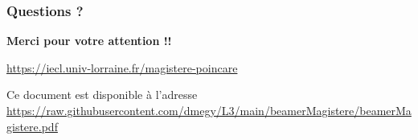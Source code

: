 \documentclass[slidetop,11pt]{beamer}
\begin{document}
\begin{frame}
\frametitle{Questions ?}

\begin{center}
{\LARGE \bf Merci pour votre attention !!}

\bigskip
{}

\bigskip
\url{https://iecl.univ-lorraine.fr/magistere-poincare}

\bigskip
Ce document est disponible à l'adresse\\
\url{https://raw.githubusercontent.com/dmegy/L3/main/beamerMagistere/beamerMagistere.pdf}
\end{center}
\end{frame}
  
\end{document}

